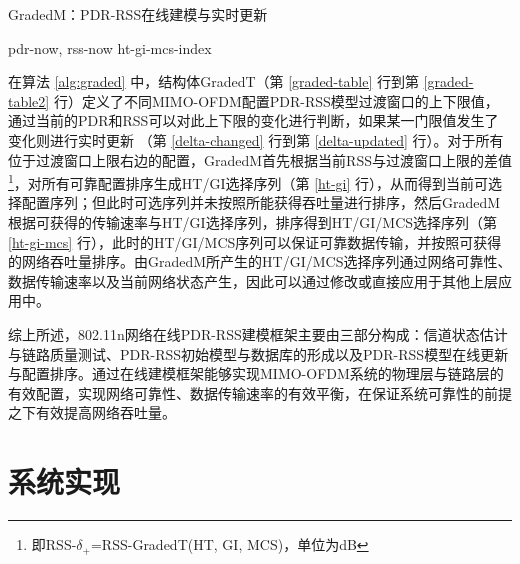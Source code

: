 \begin{algorithm}[!htp]
\renewcommand{\algorithmicrequire}{\textbf{输入：}}
\renewcommand{\algorithmicensure}{\textbf{输出：}}
\caption{GradedM：PDR-RSS在线建模与实时更新}
\label{alg:graded}
\begin{algorithmic}[1]
\Require pdr-now, rss-now
\Ensure  ht-gi-mcs-index
 \label{delta-changed}
\EndIf \label{delta-updated}
 \label{ht-gi}
 \label{ht-gi-mcs}
\State {}
\end{algorithmic}
\end{algorithm}

在算法 \ref{alg:graded} 中，结构体GradedT（第 \ref{graded-table} 行到第 \ref{graded-table2} 行）定义了不同MIMO-OFDM配置PDR-RSS模型过渡窗口的上下限值，通过当前的PDR和RSS可以对此上下限的变化进行判断，如果某一门限值发生了变化则进行实时更新 （第 \ref{delta-changed} 行到第 \ref{delta-updated} 行）。对于所有位于过渡窗口上限右边的配置，GradedM首先根据当前RSS与过渡窗口上限的差值\footnote{即RSS-$\delta_+$=RSS-GradedT(HT, GI, MCS)，单位为dB}，对所有可靠配置排序生成HT/GI选择序列（第 \ref{ht-gi} 行），从而得到当前可选择配置序列；但此时可选序列并未按照所能获得吞吐量进行排序，然后GradedM根据可获得的传输速率与HT/GI选择序列，排序得到HT/GI/MCS选择序列（第 \ref{ht-gi-mcs} 行），此时的HT/GI/MCS序列可以保证可靠数据传输，并按照可获得的网络吞吐量排序。由GradedM所产生的HT/GI/MCS选择序列通过网络可靠性、数据传输速率以及当前网络状态产生，因此可以通过修改或直接应用于其他上层应用中。

综上所述，802.11n网络在线PDR-RSS建模框架主要由三部分构成：信道状态估计与链路质量测试、PDR-RSS初始模型与数据库的形成以及PDR-RSS模型在线更新与配置排序。通过在线建模框架能够实现MIMO-OFDM系统的物理层与链路层的有效配置，实现网络可靠性、数据传输速率的有效平衡，在保证系统可靠性的前提之下有效提高网络吞吐量。

\section{系统实现}
\label{sec:system_link}

